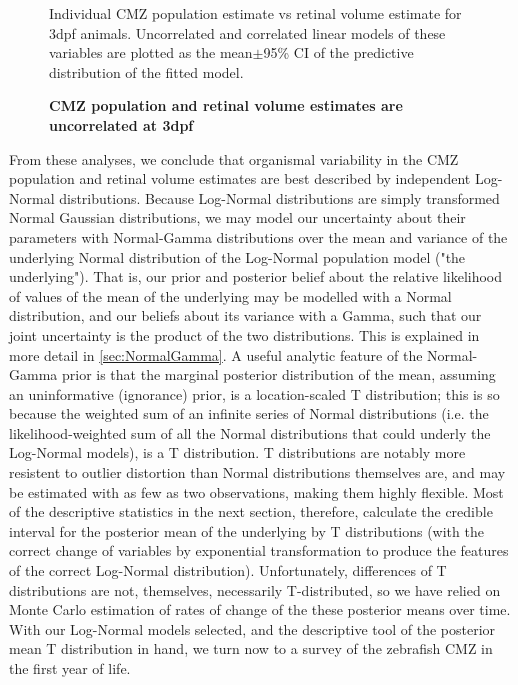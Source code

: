 \begin{figure}[!h]
    \caption{{\bf CMZ population and retinal volume estimates are uncorrelated at 3dpf}}
    Individual CMZ population estimate vs retinal volume estimate for 3dpf animals. Uncorrelated and correlated linear models of these variables are plotted as the mean$\pm$95\% CI of the predictive distribution of the fitted model.
    \label{gausscorrelation}
\end{figure}

From these analyses, we conclude that organismal variability in the CMZ population and retinal volume estimates are best described by independent Log-Normal distributions. Because Log-Normal distributions are simply transformed Normal Gaussian distributions, we may model our uncertainty about their parameters with Normal-Gamma distributions over the mean and variance of the underlying Normal distribution of the Log-Normal population model ("the underlying"). That is, our prior and posterior belief about the relative likelihood of values of the mean of the underlying may be modelled with a Normal distribution, and our beliefs about its variance with a Gamma, such that our joint uncertainty is the product of the two distributions. This is explained in more detail in \autoref{sec:NormalGamma}. A useful analytic feature of the Normal-Gamma prior is that the marginal posterior distribution of the mean, assuming an uninformative (ignorance) prior, is a location-scaled T distribution; this is so because the weighted sum of an infinite series of Normal distributions (i.e. the likelihood-weighted sum of all the Normal distributions that could underly the Log-Normal models), is a T distribution. T distributions are notably more resistent to outlier distortion than Normal distributions themselves are, and may be estimated with as few as two observations, making them highly flexible. Most of the descriptive statistics in the next section, therefore, calculate the credible interval for the posterior mean of the underlying by T distributions (with the correct change of variables by exponential transformation to produce the features of the correct Log-Normal distribution). Unfortunately, differences of T distributions are not, themselves, necessarily T-distributed, so we have relied on Monte Carlo estimation of rates of change of the these posterior means over time. With our Log-Normal models selected, and the descriptive tool of the posterior mean T distribution in hand, we turn now to a survey of the zebrafish CMZ in the first year of life.

